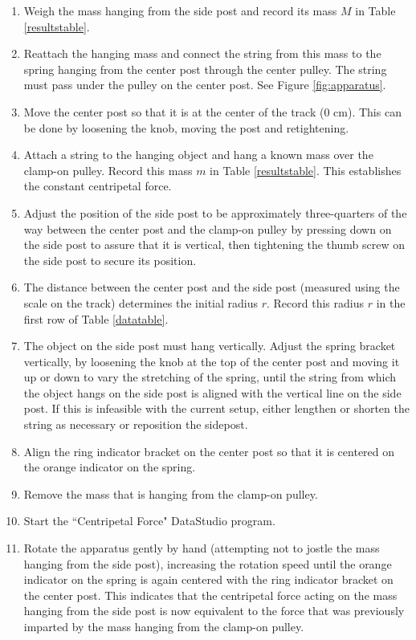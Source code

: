 \begin{enumerate}
	\item Weigh the mass hanging from the side post and record its mass $M$ in Table \ref{resultstable}.
	\item Reattach the hanging mass and connect the string from this mass to the spring hanging from the center post through the center pulley. The string must pass under the pulley on the center post. See Figure \ref{fig:apparatus}.
	\item Move the center post so that it is at the center of the track (0 cm). This can be done by loosening the knob, moving the post and retightening.
	\item Attach a string to the hanging object and hang a known mass over the clamp-on pulley. Record this mass $m$ in Table \ref{resultstable}. This establishes the constant centripetal force.
	\item Adjust the position of the side post to be approximately three-quarters of the way between the center post and the clamp-on pulley by pressing down on the side post to assure that it is vertical, then tightening the thumb screw on the side post to secure its position.
	\item The distance between the center post and the side post (measured using the scale on the track) determines the initial radius $r$. Record this radius $r$ in the first row of Table \ref{datatable}.
	\item The object on the side post must hang vertically. Adjust the spring bracket vertically, by loosening the knob at the top of the center post and moving it up or down to vary the stretching of the spring, until the string from which the object hangs on the side post is aligned with the vertical line on the side post. If this is infeasible with the current setup, either lengthen or shorten the string as necessary or reposition the sidepost.
	\item Align the ring indicator bracket on the center post so that it is centered on the orange indicator on the spring.
	\item Remove the mass that is hanging from the clamp-on pulley.
	\item Start the ``Centripetal Force" DataStudio program.
	\item Rotate the apparatus gently by hand (attempting not to jostle the mass hanging from the side post), increasing the rotation speed until the orange indicator on the spring is again centered with the ring indicator bracket on the center post. This indicates that the centripetal force acting on the mass hanging from the side post is now equivalent to the force that was previously imparted by the mass hanging from the clamp-on pulley.

\end{enumerate}
